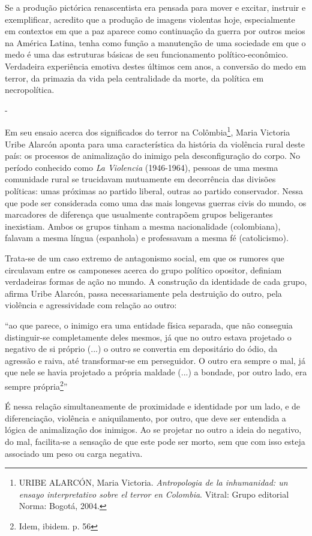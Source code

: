 Se a produção pictórica renascentista era pensada para mover e excitar,
instruir e exemplificar, acredito que a produção de imagens violentas
hoje, especialmente em contextos em que a paz aparece como continuação
da guerra por outros meios na América Latina, tenha como função a
manutenção de uma sociedade em que o medo é uma das estruturas básicas
de seu funcionamento político-econômico. Verdadeira experiência emotiva
destes últimos cem anos, a conversão do medo em terror, da primazia da
vida pela centralidade da morte, da política em necropolítica.

-

Em seu ensaio acerca dos significados do terror na Colômbia\footnote{URIBE
  ALARCÓN, Maria Victoria. \emph{Antropologia de la inhumanidad: un
  ensayo interpretativo sobre el terror en Colombia}. Vitral: Grupo
  editorial Norma: Bogotá, 2004.}, Maria Victoria Uribe Alarcón aponta
para uma característica da história da violência rural deste país: os
processos de animalização do inimigo pela desconfiguração do corpo. No
período conhecido como \emph{La Violencia} (1946-1964), pessoas de uma
mesma comunidade rural se trucidavam mutuamente em decorrência das
divisões políticas: umas próximas ao partido liberal, outras ao partido
conservador. Nessa que pode ser considerada como uma das mais longevas
guerras civis do mundo, os marcadores de diferença que usualmente
contrapõem grupos beligerantes inexistiam. Ambos os grupos tinham a
mesma nacionalidade (colombiana), falavam a mesma língua (espanhola) e
professavam a mesma fé (catolicismo).

Trata-se de um caso extremo de antagonismo social, em que os rumores que
circulavam entre os camponeses acerca do grupo político opositor,
definiam verdadeiras formas de ação no mundo. A construção da identidade
de cada grupo, afirma Uribe Alarcón, passa necessariamente pela
destruição do outro, pela violência e agressividade com relação ao
outro:

``ao que parece, o inimigo era uma entidade física separada, que não
conseguia distinguir-se completamente deles mesmos, já que no outro
estava projetado o negativo de si próprio (...) o outro se convertia em
depositário do ódio, da agressão e raiva, até transformar-se em
perseguidor. O outro era sempre o mal, já que nele se havia projetado a
própria maldade (...) a bondade, por outro lado, era sempre
própria\footnote{Idem, ibidem. p. 56}''

É nessa relação simultaneamente de proximidade e identidade por um lado,
e de diferenciação, violência e aniquilamento, por outro, que deve ser
entendida a lógica de animalização dos inimigos. Ao se projetar no outro
a ideia do negativo, do mal, facilita-se a sensação de que este pode ser
morto, sem que com isso esteja associado um peso ou carga negativa.

